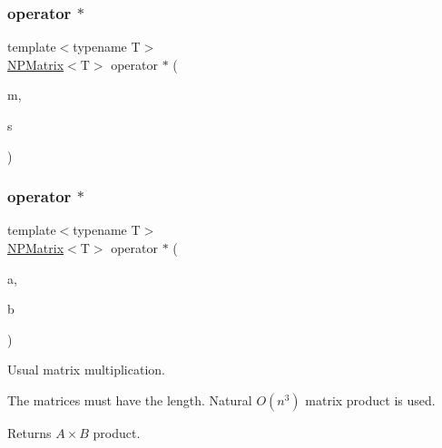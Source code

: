 \mbox{\label{class_n_p_matrix_a89a139dbf286cff061bc6b6c92b57f0b}} 
\subsubsection{\texorpdfstring{operator $\ast$}{operator *}\hspace{0.1cm}{\footnotesize\ttfamily [2/4]}}
{\footnotesize\ttfamily template$<$typename T$>$ \\
\mbox{\hyperlink{class_n_p_matrix}{N\+P\+Matrix}}$<$T$>$ operator $\ast$ (\begin{DoxyParamCaption}\item[{\mbox{\hyperlink{class_n_p_matrix}{N\+P\+Matrix}}$<$ T $>$}]{m,  }\item[{T}]{s }\end{DoxyParamCaption})\hspace{0.3cm}{\ttfamily [friend]}}

\mbox{\label{class_n_p_matrix_ac6fa24ae5fd1897e69914f3ae398d29f}} 
\subsubsection{\texorpdfstring{operator $\ast$}{operator *}\hspace{0.1cm}{\footnotesize\ttfamily [3/4]}}
{\footnotesize\ttfamily template$<$typename T$>$ \\
\mbox{\hyperlink{class_n_p_matrix}{N\+P\+Matrix}}$<$T$>$ operator $\ast$ (\begin{DoxyParamCaption}\item[{\mbox{\hyperlink{class_n_p_matrix}{N\+P\+Matrix}}$<$ T $>$}]{a,  }\item[{const \mbox{\hyperlink{class_n_p_matrix}{N\+P\+Matrix}}$<$ T $>$ \&}]{b }\end{DoxyParamCaption})\hspace{0.3cm}{\ttfamily [friend]}}



Usual matrix multiplication. 

The matrices must have the length. Natural $ O(n^3) $ matrix product is used. \begin{DoxyReturn}{Returns}
$ A \times B $ product. 
\end{DoxyReturn}
\mbox{\label{class_n_p_matrix_a27b5aa229eb163bfb79d7925abffafb7}} 
